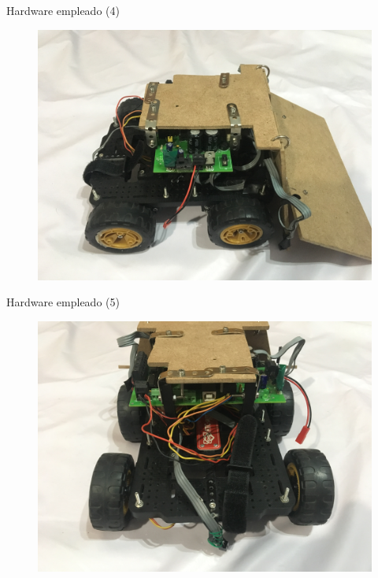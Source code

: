 \documentclass[spanish]{beamer}
\begin{document}
\begin{frame}{Hardware empleado (4)}
  \begin{figure}
    \includegraphics[scale=0.07]{./img/zigurat3}
    \end{figure}
\end{frame}

\begin{frame}{Hardware empleado (5)}
  \begin{figure}
    \includegraphics[scale=0.07]{./img/zigurat4}
    \end{figure}
\end{frame}
\end{document}
